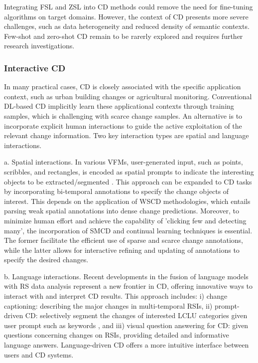 Integrating FSL and ZSL into CD methods could remove the need for fine-tuning algorithms on target domains. However, the context of CD presents more severe challenges, such as data heterogeneity and reduced density of semantic contexts. Few-shot and zero-shot CD remain to be rarerly explored and requires further research investigations.

\subsubsection{Interactive CD}

In many practical cases, CD is closely associated with the specific application context, such as urban building changes or agricultural monitoring. Conventional DL-based CD implicitly learn these applicational contexts through training samples, which is challenging with scarce change samples. An alternative is to incorporate explicit human interactions to guide the active exploitation of the relevant change information. Two key interaction types are spatial and language interactions.

a. Spatial interactions. In various VFMs, user-generated input, such as points, scribbles, and rectangles, is encoded as spatial prompts to indicate the interesting objects to be extracted/segmented \cite{Kirillov2023Segment}. This approach can be expanded to CD tasks by incorporating bi-temporal annotations to specify the change objects of interest. This depends on the application of WSCD methodologies, which entails parsing weak spatial annotations into dense change predictions. Moreover, to minimize human effort and achieve the capability of 'clicking few and detecting many', the incorporation of SMCD and continual learning techniques \cite{douillard2021plop} is essential. The former facilitate the efficient use of sparse and scarce change annotations, while the latter allows for interactive refining and updating of annotations to specify the desired changes.

b. Language interactions. Recent developments in the fusion of language models with RS data analysis represent a new frontier in CD, offering innovative ways to interact with and interpret CD results. This approach includes: i) change captioning: describing the major changes in multi-temporal RSIs, ii) prompt-driven CD: selectively segment the changes of interested LCLU categories given user prompt such as keywords \cite{dong2024changeclip}, and iii) visual question answering for CD: given questions concerning changes on RSIs, providing detailed and informative language answers. Language-driven CD offers a more intuitive interface between users and CD systems.

